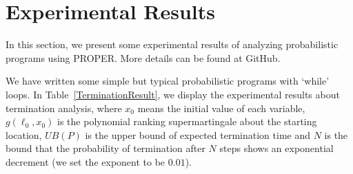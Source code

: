 \documentclass[sigconf,review, anonymous]{acmart}
\begin{document}
\section{Experimental Results}
In this section, we present some experimental results of analyzing probabilistic programs using PROPER. More details can be found at GitHub.


We have written some simple but typical probabilistic programs with `while' loops. In Table~\ref{TerminationResult}, we display the experimental results about termination analysis, where $x_0$ means the initial value of each variable, $g(\ell_0,x_0)$ is the polynomial ranking supermartingale about the starting location, $UB(P)$ is the upper bound of expected termination time and $N$ is the bound that the probability of termination after $N$ steps shows an exponential decrement (we set the exponent to  be $0.01$).
\end{document}
